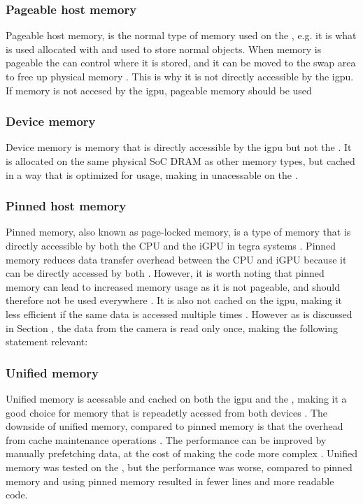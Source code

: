\subsubsection{Pageable host memory}
Pageable host memory, is the normal type of memory used on the \jx,
e.g. it is what is used allocated with  and used to store normal \py objects.
When memory is pageable the \cpu can control where it is stored, and it can be moved to the \gls{swap} area to free up physical memory \cite[6]{nvidiaCUDAFTegra2023}.
This is why it is not directly accessible by the \gls{igpu}.
If memory is not accesed by the \gls{igpu}, pageable memory should be used \cite[9]{nvidiaCUDAFTegra2023}


\subsubsection{Device memory}
Device memory is memory that is directly accessible by the \gls{igpu} but not the \cpu \cite[5]{nvidiaCUDAFTegra2023}.
It is allocated on the same physical SoC DRAM as other memory types, but cached in a way that is optimized for \gpu usage, making in unacessable on the \cpu \cite[5]{nvidiaCUDAFTegra2023}.


\subsubsection{Pinned host memory}
Pinned memory, also known as page-locked memory, is a type of memory that is directly accessible by both the CPU and the iGPU in \gls{tegra} systems \cite{nvidiaCUDAFTegra2023}.
Pinned memory reduces data transfer overhead between the CPU and iGPU because it can be directly accessed by both \cite{nvidiaCUDAFTegra2023}.
However, it is worth noting that pinned memory can lead to increased memory usage as it is not pageable, and should therefore not be used everywhere \cite[38]{nvidiaCUDABestPractices2023}.
It is also not cached on the \gls{igpu}, making it less efficient if the same data is accessed multiple times \cite{nvidiaCUDAFTegra2023}.
However as is discussed in Section \todo, the data from the camera is read only once, making the following statement relevant:
\cite[10]{nvidiaCUDAFTegra2023}


\subsubsection{Unified memory}
Unified memory is acessable and cached on both the \gls{igpu} and the \cpu, making it a good choice for memory that is repeadetly acessed from both devices \cite[10]{nvidiaCUDAFTegra2023}.
The downside of unified memory, compared to pinned memory is that the overhead from cache maintenance operations \cite[12]{nvidiaCUDAFTegra2023}.
The performance can be improved by manually prefetching data, at the cost of making the code more complex \cite[13]{nvidiaCUDAFTegra2023}.
Unified memory was tested on the \sr, but the performance was worse, compared to pinned memory and using pinned memory resulted in fewer lines and more readable code.
